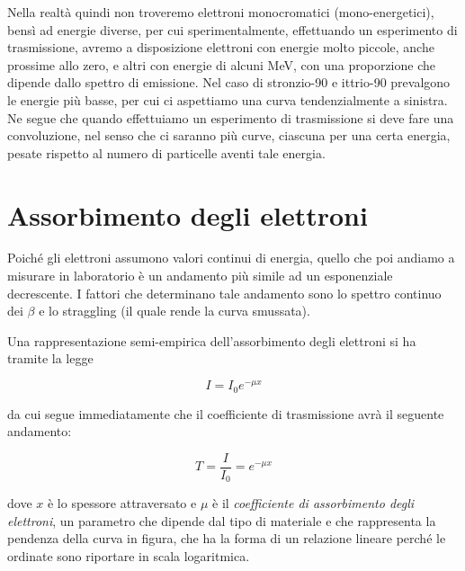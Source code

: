 Nella realtà quindi non troveremo elettroni monocromatici (mono-energetici), bensì ad energie diverse, per cui sperimentalmente, effettuando un esperimento di trasmissione, avremo a disposizione elettroni con energie molto piccole, anche prossime allo zero, e altri con energie di alcuni MeV, con una proporzione che dipende dallo spettro di emissione. Nel caso di stronzio-90 e ittrio-90 prevalgono le energie più basse, per cui ci aspettiamo una curva tendenzialmente a sinistra. Ne segue che quando effettuiamo un esperimento di trasmissione si deve fare una convoluzione, nel senso che ci saranno più curve, ciascuna per una certa energia, pesate rispetto al numero di particelle aventi tale energia.

\section{Assorbimento degli elettroni}
Poiché gli elettroni assumono valori continui di energia, quello che poi andiamo a misurare in laboratorio è un andamento più simile ad un esponenziale decrescente. I fattori che determinano tale andamento sono lo spettro continuo dei $\beta$ e lo straggling (il quale rende la curva smussata).

Una rappresentazione semi-empirica dell'assorbimento degli elettroni si ha tramite la legge

\begin{equation*}
    I=I_0 e^{-\mu x}
\end{equation*}

da cui segue immediatamente che il coefficiente di trasmissione avrà il seguente andamento:

\begin{equation*}
    T=\frac{I}{I_0}=e^{-\mu x}
\end{equation*}

dove $x$ è lo spessore attraversato e $\mu$ è il \textit{coefficiente di assorbimento degli elettroni}, un parametro che dipende dal tipo di materiale e che rappresenta la pendenza della curva in figura, che ha la forma di un relazione lineare perché le ordinate sono riportare in scala logaritmica.

